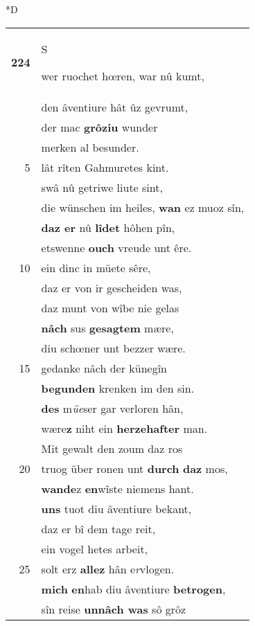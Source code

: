 \documentclass[8pt,a4paper,notitlepage]{article}
\begin{document}
\begin{table}[ht]
\begin{minipage}[t]{0.5\linewidth}
\small
\begin{center}*D
\end{center}
\begin{tabular}{rl}
\textbf{224} & \begin{large}S\end{large}wer ruochet hœren, war nû kumt,\\ 
 & den âventiure hât ûz gevrumt,\\ 
 & der mac \textbf{grôziu} wunder\\ 
 & merken al besunder.\\ 
5 & lât rîten Gahmuretes kint.\\ 
 & swâ nû getriwe liute sint,\\ 
 & die wünschen im heiles, \textbf{wan} ez muoz sîn,\\ 
 & \textbf{daz er} nû \textbf{lîdet} hôhen pîn,\\ 
 & etswenne \textbf{ouch} vreude unt êre.\\ 
10 & ein dinc in müete sêre,\\ 
 & daz er von ir gescheiden was,\\ 
 & daz munt von wîbe nie gelas\\ 
 & \textbf{nâch} sus \textbf{gesagtem} mære,\\ 
 & diu schœner unt bezzer wære.\\ 
15 & gedanke nâch der künegîn\\ 
 & \textbf{begunden} krenken im den sin.\\ 
 & \textbf{des} m\textit{üe}ser gar verloren hân,\\ 
 & wære\textbf{z} niht ein \textbf{herzehafter} man.\\ 
 & Mit gewalt den zoum daz ros\\ 
20 & truog über ronen unt \textbf{durch} \textbf{daz} mos,\\ 
 & \textbf{wande}z \textbf{en}wîste niemens hant.\\ 
 & \textbf{uns} tuot diu âventiure bekant,\\ 
 & daz er bî dem tage reit,\\ 
 & ein vogel hetes arbeit,\\ 
25 & solt erz \textbf{allez} hân e\textit{r}vlogen.\\ 
 & \textbf{mich} \textbf{en}hab diu âventiure \textbf{betrogen},\\ 
 & sîn reise \textbf{unnâch was} sô grôz\\ 

\end{tabular}
\end{minipage}
\end{table}
\end{document}
